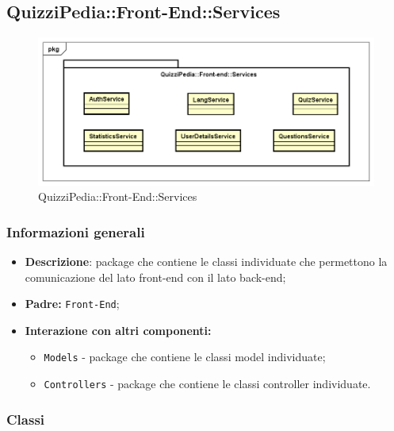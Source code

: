 \newpage
\subsection{QuizziPedia::Front-End::Services}
\begin{figure}
	\centering
	\includegraphics[scale=0.45]{UML/Package/QuizziPedia_Front-End_Services.png}
	\caption{QuizziPedia::Front-End::Services}
\end{figure}
\subsubsection{Informazioni generali}
\begin{itemize}
	\item \textbf{Descrizione}: package che contiene le classi individuate che permettono la comunicazione del lato front-end con il lato back-end;
	\item \textbf{Padre:} \texttt{Front-End};
	\item \textbf{Interazione con altri componenti:}
	\begin{itemize}
		\item \texttt{Models} - package che contiene le classi model individuate;
		\item \texttt{Controllers} - package che contiene le classi controller individuate.
	\end{itemize} 
\end{itemize}
\subsubsection{Classi}

